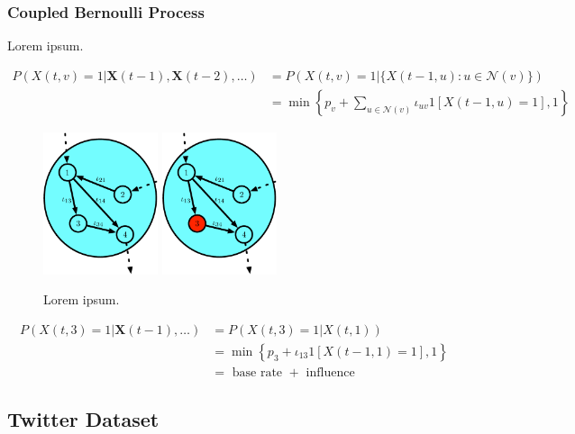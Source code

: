 \documentclass[12pt]{article}
\begin{document}
\subsubsection{Coupled Bernoulli Process}

Lorem ipsum. \cite{ver2012information}

\begin{align}
	P(X(t, v) = 1 | \mathbf{X}(t-1), \mathbf{X}(t-2), \ldots) &= P(X(t,v) = 1 | \{ X(t-1, u) : u \in \mathcal{N}(v)\})\\
	&=\min \left\{p_{v} + \sum_{u \in \mathcal{N}(v)} \iota_{uv} 1[X(t-1, u) = 1], 1\right\}
\end{align}

\begin{figure}[h!]
  \centering
\includegraphics[width=0.3\textwidth]{Figures/Toy1.eps} \hspace{1 in}
\includegraphics[width=0.3\textwidth]{Figures/Toy2.eps}
\caption{Lorem ipsum.}
\label{Fig-Toy_Bernoulli}
\end{figure}

\begin{align}
	P(X(t, 3) = 1 | \mathbf{X}(t-1), \ldots) &= P(X(t,3) = 1 | X(t, 1)) \\
		&= \min \left\{p_{3} + \iota_{13} 1[X(t-1, 1) = 1], 1\right\}\\
		&= \text{ base rate } + \text{ influence }
\end{align}

\subsection{Twitter Dataset}
\end{document}
